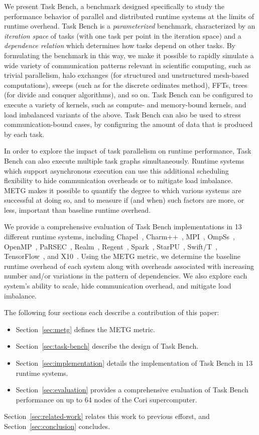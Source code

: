 We present Task Bench, a benchmark designed specifically to study the
performance behavior of parallel and distributed runtime systems at
the limits of runtime overhead. Task Bench is a \emph{parameterized}
benchmark, characterized by an \emph{iteration space} of tasks (with
one task per point in the iteration space) and a \emph{dependence
  relation} which determines how tasks depend on other tasks. By
formulating the benchmark in this way, we make it possible to rapidly
simulate a wide variety of communication patterns relevant in
scientific computing, such as trivial parallelism, halo exchanges (for
structured and unstructured mesh-based computations), sweeps (such as
for the discrete ordinates method), FFTs, trees (for divide and
conquer algorithms), and so on. Task Bench can be configured to
execute a variety of kernels, such as compute- and memory-bound
kernels, and load imbalanced variants of the above. Task Bench can
also be used to stress communication-bound cases, by configuring the
amount of data that is produced by each task.

In order to explore the impact of task parallelism on runtime
performance, Task Bench can also execute multiple task graphs
simultaneously. Runtime systems which support asynchronous execution
can use this additional scheduling flexibility to hide communication
overheads or to mitigate load imbalance. METG makes it possible to
quantify the degree to which various systems are successful at doing
so, and to measure if (and when) such factors are more, or less,
important than baseline runtime overhead.

We provide a comprehensive evaluation of Task Bench implementations in
13 different runtime systems, including Chapel~\cite{Chapel07},
Charm++~\cite{Charmpp93}, MPI~\cite{MPI}, OmpSs~\cite{OmpSs11},
OpenMP~\cite{OpenMPSpec40}, PaRSEC~\cite{PARSEC13},
Realm~\cite{Realm14}, Regent~\cite{Regent15}, Spark~\cite{Spark10},
StarPU~\cite{StarPU11}, Swift/T~\cite{Wozniak13},
TensorFlow~\cite{TensorFlow15}, and X10~\cite{X1005}. Using the METG
metric, we determine the baseline runtime overhead of each system
along with overheads associated with increasing number and/or
variations in the pattern of dependencies. We also explore each
system's ability to scale, hide communication overhead, and mitigate
load imbalance.

The following four sections each describe a contribution of this
paper:

\begin{itemize}
\item Section~\ref{sec:metg} defines the METG metric.
\item Section~\ref{sec:task-bench} describe the design of Task Bench.
\item Section~\ref{sec:implementation} details the implementation of
  Task Bench in 13 runtime systems.
\item Section~\ref{sec:evaluation} provides a comprehensive evaluation
  of Task Bench performance on up to 64 nodes of the Cori
  supercomputer.
\end{itemize}

Section~\ref{sec:related-work} relates this work to previous efforst,
and Section~\ref{sec:conclusion} concludes.
